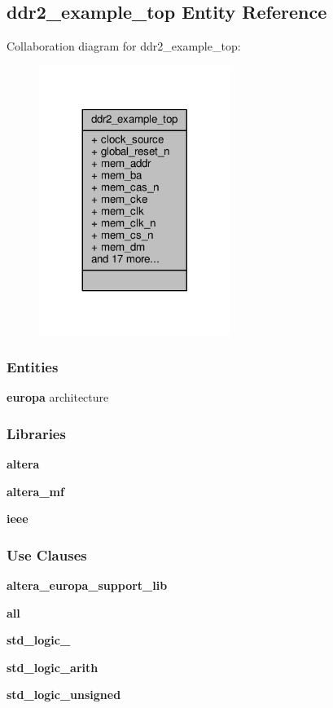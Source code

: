 \subsection{ddr2\+\_\+example\+\_\+top Entity Reference}
\label{classddr2__example__top}


Collaboration diagram for ddr2\+\_\+example\+\_\+top\+:\nopagebreak
\begin{figure}[H]
\begin{center}
\leavevmode
\includegraphics[width=176pt]{d7/d5e/classddr2__example__top__coll__graph}
\end{center}
\end{figure}
\subsubsection*{Entities}
\begin{DoxyCompactItemize}
\item 
{\bf europa} architecture
\end{DoxyCompactItemize}
\subsubsection*{Libraries}
 \begin{DoxyCompactItemize}
\item 
{\bf altera} 
\item 
{\bf altera\+\_\+mf} 
\item 
{\bf ieee} 
\end{DoxyCompactItemize}
\subsubsection*{Use Clauses}
 \begin{DoxyCompactItemize}
\item 
{\bf altera\+\_\+europa\+\_\+support\+\_\+lib}   
\item 
{\bf  all }   
\item 
{\bf std\+\_\+logic\+\_}   
\item 
{\bf std\+\_\+logic\+\_\+arith}   
\item 
{\bf std\+\_\+logic\+\_\+unsigned}   
\end{DoxyCompactItemize}
